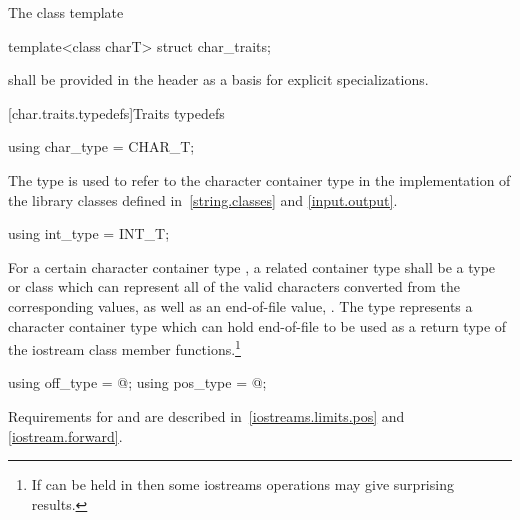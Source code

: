 \pnum
The class template

%
\begin{codeblock}
template<class charT> struct char_traits;
\end{codeblock}

shall be provided in the header
as a basis for explicit specializations.

[char.traits.typedefs]{Traits typedefs}

%
\begin{itemdecl}
using char_type = CHAR_T;
\end{itemdecl}

\begin{itemdescr}
\pnum
The type
is used to refer to the character container type
in the implementation of the library classes defined in~\ref{string.classes} and \ref{input.output}.
\end{itemdescr}

%
\begin{itemdecl}
using int_type = INT_T;
\end{itemdecl}

\begin{itemdescr}
\pnum
\requires
For a certain character container type
,
a related container type
shall be a type or class which can represent all of the
valid characters converted from the corresponding
values, as well as an end-of-file value,
.
The type
represents a character container type
which can hold end-of-file to be used as a return type
of the iostream class member functions.\footnote{If
can be held in
then some iostreams operations may give surprising results.}
\end{itemdescr}

%
%
\begin{itemdecl}
using off_type = @\impdef@;
using pos_type = @\impdef@;
\end{itemdecl}

\begin{itemdescr}
\pnum
\requires
Requirements for
and
are described in~\ref{iostreams.limits.pos} and \ref{iostream.forward}.
\end{itemdescr}

